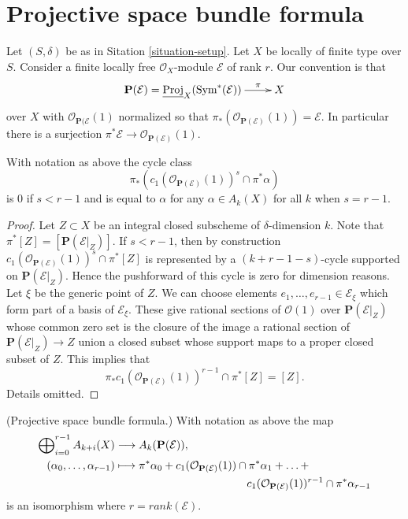 \section{Projective space bundle formula}
\label{section-projective-space-bundle-formula}

\noindent
Let $(S, \delta)$ be as in Sitation \ref{situation-setup}.
Let $X$ be locally of finite type over $S$.
Consider a finite locally free $\mathcal{O}_X$-module
$\mathcal{E}$ of rank $r$.
Our convention is that
$$
\xymatrix{
\mathbf{P}(\mathcal{E})
=
\underline{\text{Proj}}_X(\text{Sym}^*(\mathcal{E}))
\ar[r]^-\pi
& X
}
$$
over $X$ with
$\mathcal{O}_{\mathbf{P}(\mathcal{E}}(1)$ normalized so that
$\pi_*(\mathcal{O}_{\mathbf{P}(\mathcal{E})}(1)) = \mathcal{E}$.
In particular there is a surjection
$\pi^*\mathcal{E} \to \mathcal{O}_{\mathbf{P}(\mathcal{E})}(1)$.

\begin{lemma}
\label{lemma-cap-projective-bundle}
With notation as above the cycle class
$$
\pi_*\left(
c_1(\mathcal{O}_{\mathbf{P}(\mathcal{E})}(1))^s \cap \pi^*\alpha
\right)
$$
is $0$ if $s < r - 1$ and is equal to $\alpha$
for any $\alpha \in A_k(X)$ for all $k$ when $s = r - 1$.
\end{lemma}

\begin{proof}
Let $Z \subset X$ be an integral closed subscheme of $\delta$-dimension $k$.
Note that $\pi^*[Z] = [\mathbf{P}(\mathcal{E}|_Z)]$.
If $s < r - 1$, then by construction
$c_1(\mathcal{O}_{\mathbf{P}(\mathcal{E})}(1))^s \cap \pi^*[Z]$
is represented by a $(k + r - 1 - s)$-cycle supported on
$\mathbf{P}(\mathcal{E}|_Z)$. Hence the pushforward of this cycle
is zero for dimension reasons.
Let $\xi$ be the generic point of $Z$.
We can choose elements $e_1, \ldots, e_{r - 1} \in \mathcal{E}_\xi$
which form part of a basis of $\mathcal{E}_\xi$. These give rational
sections of $\mathcal{O}(1)$ over $\mathbf{P}(\mathcal{E}|_Z)$
whose common zero set is the closure of the image a rational section of
$\mathbf{P}(\mathcal{E}|_Z) \to Z$ union a closed subset whose
support maps to a proper closed subset of $Z$. This implies that
$$
\pi_* c_1(\mathcal{O}_{\mathbf{P}(\mathcal{E})}(1))^{r - 1} \cap \pi^*[Z]
=
[Z].
$$
Details omitted.
\end{proof}

\begin{lemma}
\label{lemma-chow-ring-projective-bundle}
(Projective space bundle formula.)
With notation as above the map
\begin{align*}
\bigoplus\nolimits_{i=0}^{r-1} A_{k + i}(X)
& \longrightarrow
A_k({\bf P}({\mathcal E})), \\
(\alpha_0,\ldots,\alpha_{r-1}) &
\longmapsto
\pi^*\alpha_0 +
c_1(\mathcal{O}_{\mathbf{P}(\mathcal{E})}(1)) \cap \pi^*\alpha_1
+ \ldots + \\
&
\quad \quad \quad \quad
\quad \quad \quad \quad
\quad \quad \quad \quad
c_1(\mathcal{O}_{\mathbf{P}(\mathcal{E})}(1))^{r - 1} \cap \pi^*\alpha_{r-1}
\end{align*}
is an isomorphism where $r = rank({\mathcal E})$.
\end{lemma}

